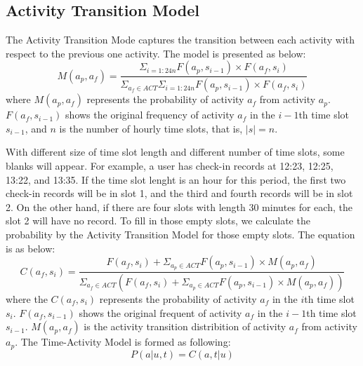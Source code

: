 \subsection{Activity Transition Model}
The Activity Transition Mode captures the transition between each activity with respect to the previous one activity. The model is presented as below:
\begin{equation}
\label{equ:order1}
M(a_p,a_f )=\frac{\Sigma_{i=1:24n}F(a_p,s_{i-1})\times F(a_f,s_i ) }{\Sigma_{a_f \in ACT} \Sigma_{i=1:24n}F(a_p,s_{i-1})\times F(a_f,s_i )} 
\end{equation}
 where $M(a_p,a_f )$ represents the probability of activity $a_f$ from activity $a_p$. $F(a_f,s_{i-1})$ shows the original frequency of activity $a_f$ in the $i-1$th time slot $s_{i-1}$, and $n$ is the number of hourly time slots, that is, $|s|=n$.


With different size of time slot length and different number of time slots, some blanks will appear. For example, a user has check-in records at 12:23, 12:25, 13:22, and 13:35. If the time slot lenght is an hour for this period, the first two check-in records will be in slot 1, and the third and fourth records will be in slot 2. On the other hand, if there are four slots with length 30 minutes for each, the slot 2 will have no record. To fill in those empty slots, we calculate the probability by the Activity Transition Model for those empty slots.
The equation is as below:
\begin{equation}
\label{equ:fill blank}
C(a_f,s_i )=\frac{F(a_f,s_i)+\Sigma_{a_p\in ACT} F(a_p,s_{i-1})\times M(a_p,a_f)}{\Sigma_{a_f\in ACT}(F(a_f,s_i)+\Sigma_{a_p\in ACT}F(a_p,s_{i-1})\times M(a_p,a_f))}
\end{equation}
 where the $C(a_f,s_i )$ represents the probability of activity $a_f$ in the $i$th time slot $s_i$. $F(a_f,s_{i-1})$ shows the original frequent of activity $a_f$ in the $i-1$th time slot $s_{i-1}$. $M(a_p,a_f )$ is the activity transition distribition of activity $a_f$ from activity $a_p$. The Time-Activity Model is formed as following:
\begin{equation}
P(a|u,t)=C(a,t|u)
\end{equation}



